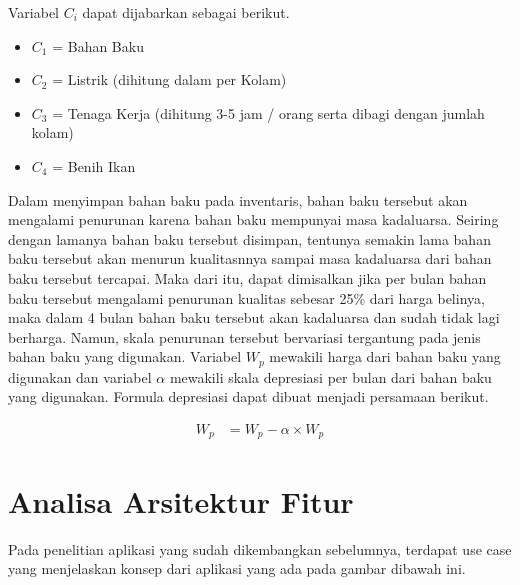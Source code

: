 Variabel $C_i$ dapat dijabarkan sebagai berikut.

\begin{itemize}
	\item $C_1$ = Bahan Baku
	\item $C_2$ = Listrik (dihitung dalam per Kolam)
	\item $C_3$ = Tenaga Kerja (dihitung 3-5 jam / orang serta dibagi dengan jumlah kolam)
	\item $C_4$ = Benih Ikan
\end{itemize}

Dalam menyimpan bahan baku pada inventaris, bahan baku tersebut akan mengalami penurunan karena bahan baku mempunyai masa kadaluarsa. Seiring dengan lamanya bahan baku tersebut disimpan, tentunya semakin lama bahan baku tersebut akan menurun kualitasnnya sampai masa kadaluarsa dari bahan baku tersebut tercapai. Maka dari itu, dapat dimisalkan jika per bulan bahan baku tersebut mengalami penurunan kualitas sebesar 25\% dari harga belinya, maka dalam 4 bulan bahan baku tersebut akan kadaluarsa dan sudah tidak lagi berharga. Namun, skala penurunan tersebut bervariasi tergantung pada jenis bahan baku yang digunakan. Variabel $W_p$ mewakili harga dari bahan baku yang digunakan dan variabel $\alpha$ mewakili skala depresiasi per bulan dari bahan baku yang digunakan. Formula depresiasi dapat dibuat menjadi persamaan berikut.

\begin{equation}
    \begin{split}
		W_p
		&= W_p - \alpha \times W_p
    \end{split}
\end{equation}

\section{Analisa Arsitektur Fitur}

Pada penelitian aplikasi yang sudah dikembangkan sebelumnya, terdapat use case yang menjelaskan konsep dari aplikasi yang ada pada gambar dibawah ini.

